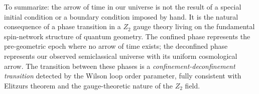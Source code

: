 To summarize: the arrow of time in our universe is not the result of a special initial condition or a boundary condition imposed by hand. It is the natural consequence of a phase transition in a \(Z_2\) gauge theory living on the fundamental spin-network structure of quantum geometry. The confined phase represents the pre-geometric epoch where no arrow of time exists; the deconfined phase represents our observed semiclassical universe with its uniform cosmological arrow. The transition between these phases is a \emph{confinement-deconfinement transition} detected by the Wilson loop order parameter, fully consistent with Elitzur\textquotesingle s theorem and the gauge-theoretic nature of the \(Z_2\) field.
